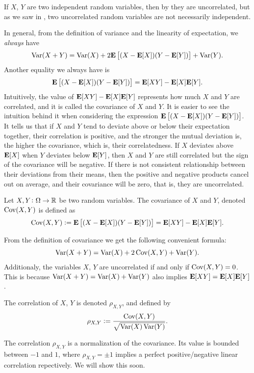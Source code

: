 \documentclass[11pt,a4paper]{article}
\begin{document}
\begin{remark}
  If $X$, $Y$ are two independent random variables, then
  by 
  they are uncorrelated,
  but as we saw in ,
  two uncorrelated random variables are not necessarily independent.
\end{remark}

\begin{remark}
In general, from the definition of variance
and the linearity of expectation, we \textit{always} have
\[
  \operatorname{Var}(X + Y) =
  \operatorname{Var}(X) + 
  2 \mathbf{E} \left[ (X - \mathbf{E}[X])(Y - \mathbf{E}[Y]) \right] +
  \operatorname{Var}(Y).
\]
Another equality we always have is
\[
  \mathbf{E} \left[(X - \mathbf{E}[X])(Y - \mathbf{E}[Y])\right] =
  \mathbf{E}[XY] - \mathbf{E}[X] \mathbf{E}[Y].
\]
Intuitively, 
the value of $\mathbf{E}[XY] - \mathbf{E}[X] \mathbf{E}[Y]$ represents how much $X$ and $Y$
are correlated, and it is called the covariance of $X$ and $Y$.
It is easier to see the intuition behind it when considering the expression
$\mathbf{E} \left[(X - \mathbf{E}[X])(Y - \mathbf{E}[Y])\right]$.
It tells us that if $X$ and $Y$ tend to deviate
above or below their expectation together,
their correlation is positive, and the stronger the mutual
deviation is, the higher the covariance, which is, their correlatedness.
If $X$ deviates above $\mathbf{E}[X]$ when $Y$ deviates below $\mathbf{E}[Y]$,
then $X$ and $Y$ are still correlated but the sign of the covariance
will be negative.
If there is not consistent relationship between their deviations from their
means, then the positive and negative products cancel out on average,
and their covariance will be zero,
that is, they are uncorrelated.
\end{remark}

\begin{definition}[Covariance]
  Let $X,Y \colon \Omega \to \mathbb{R}$ be two random variables.
  The covariance of $X$ and $Y$, denoted $\operatorname{Cov}(X,Y)$ is defined
  as
  \[
    \operatorname{Cov}(X,Y) :=
    \mathbf{E} \left[(X - \mathbf{E}[X])(Y - \mathbf{E}[Y])\right] =
    \mathbf{E}[XY] - \mathbf{E}[X] \mathbf{E}[Y].
  \]
\end{definition}

\begin{remark}
  From the definition of covariance we get the following convenient formula:
  \[
    \operatorname{Var}(X + Y) = \operatorname{Var}(X) + 2 \operatorname{Cov}(X,Y) + \operatorname{Var}(Y).
  \]
  Additionaly, the variables $X$, $Y$ are uncorrelated if and only if
  $\operatorname{Cov}(X,Y) = 0$.
  This is because $\operatorname{Var}(X + Y) = \operatorname{Var}(X) + \operatorname{Var}(Y)$
  also implies $\mathbf{E}[XY] = \mathbf{E}[X] \mathbf{E}[Y]$.
\end{remark}

\begin{definition}[Correlation]
  The correlation of $X$, $Y$ is denoted $\rho_{X,Y}$, and defined
  by
  \[
    \rho_{X,Y} :=
    \frac{\operatorname{Cov}(X,Y)}{\sqrt{\operatorname{Var}(X)\operatorname{Var}(Y)}}.
  \]
\end{definition}
\begin{remark}
  \label{rmk:correlation-pm-one}
  The correlation $\rho_{X,Y}$ is a normalization of the covariance.
  Its value is bounded between $-1$ and $1$,
  where $\rho_{X,Y} = \pm1$ implies
  a perfect positive/negative linear correlation
  repectively.
  We will show this soon.
\end{remark}
\end{document}
